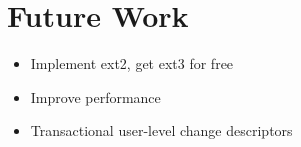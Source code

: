 \section {Future Work}
\label{sec:future}

\begin{itemize}
\item Implement ext2, get ext3 for free
\item Improve performance
\item Transactional user-level change descriptors
\end{itemize}
